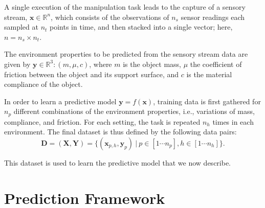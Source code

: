 

A single execution of the manipulation task leads to the capture of a sensory stream, $\mathbf{x}\in\mathbb{R}^{n}$, which consists of the observations of $n_s$ sensor readings each sampled at $n_t$ points in time, and then stacked into a single vector; here, $n=n_s \times n_t$. 

The environment properties to be predicted from the sensory stream data are given by $\mathbf{y}\in\mathbb{R}^{3}: (m,\mu,c)$, where $m$ is the object mass, $\mu$ the coefficient of friction between the object and its support surface, and $c$ is the material compliance of the object.

In order to learn a predictive model $\mathbf{y}=f(\mathbf{x})$, training data is first gathered for $n_p$ different combinations of the environment properties, i.e., variations of mass, compliance, and friction.
For each setting, the task is repeated $n_h$ times in each environment.
The final dataset is thus defined by the following data pairs:
\begin{equation}   \mathbf{D} = (\mathbf{X},\mathbf{Y}) = \{ (\mathbf{x}_{p,h},\mathbf{y}_{p})~\lvert~p\in[1\cdots n_p],h\in[1\cdots n_h] \}. \end{equation} 


This dataset is used to learn the predictive model that we now describe.


\section{Prediction Framework}

